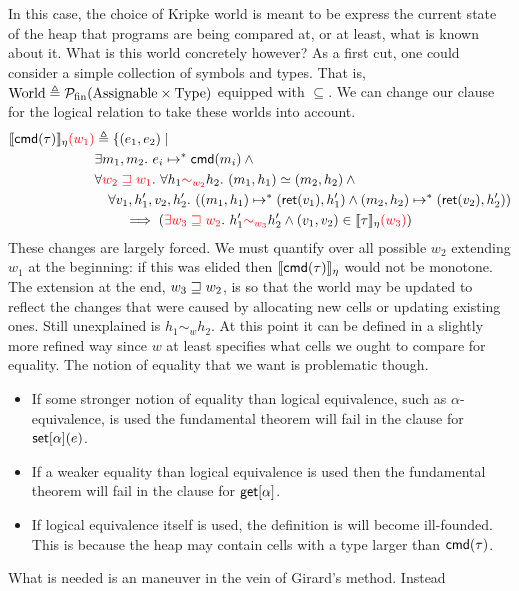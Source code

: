In this case, the choice of Kripke world is meant to be express the
current state of the heap that programs are being compared at, or at
least, what is known about it. What is this world concretely however?
As a first cut, one could consider a simple collection of symbols and
types. That is,
$\mathrm{World} \triangleq \mathcal{P_{\mathrm{fin}}}(\mathrm{Assignable} \times \mathrm{Type})$ equipped with
$\subseteq$. We can change our clause for the logical relation to take
these worlds into account.
\begin{align*}
  \llbracket \mathsf{cmd}(\tau) \rrbracket_\eta{\color{red} (w_1)}& \triangleq \{(e_1, e_2) \mid\\
  &\exists m_1, m_2.\ e_i \mapsto^* \mathsf{cmd}(m_i) \land{}\\
  &\forall {\color{red} w_2 \ensuremath{\mathrel{\sqsupseteq}}w_1}.\ \forall h_1 {\color{red} \sim_{w_2}} h_2.
  \ (m_1, h_1) \simeq (m_2, h_2) \land{}\\
  &\quad \forall v_1, h_1', v_2, h_2'.
  \ ((m_1, h_1) \mapsto^{*} (\mathsf{ret}(v_1), h_1') \land (m_2, h_2) \mapsto^{*} (\mathsf{ret}(v_2), h_2'))\\
  &\qquad \implies ({\color{red} \exists w_3 \mathrel{\sqsupseteq} w_2}.
    \ h_1' {\color{red} \sim_{w_3}} h_2' \land (v_1, v_2) \in \llbracket \tau \rrbracket_\eta{\color{red} (w_3)})
\end{align*}
These changes are largely forced. We must quantify over all possible
$w_2$ extending $w_1$ at the beginning: if this was elided then
$\llbracket \mathsf{cmd}(\tau) \rrbracket_\eta$ would not be monotone. The extension at the
end, $w_3 \mathrel{\sqsupseteq} w_2$, is so that the world may be updated to reflect
the changes that were caused by allocating new cells or updating
existing ones. Still unexplained is $h_1 \sim_w h_2$. At this point it
can be defined in a slightly more refined way since $w$ at least
specifies what cells we ought to compare for equality. The notion of
equality that we want is problematic though.
\begin{itemize}
\item If some stronger notion of equality than logical equivalence,
  such as $\alpha$-equivalence, is used the fundamental theorem will
  fail in the clause for $\mathsf{set}[\alpha](e)$.
\item If a weaker equality than logical equivalence is used then the
  fundamental theorem will fail in the clause for $\mathsf{get}[\alpha]$.
\item If logical equivalence itself is used, the definition is will
  become ill-founded. This is because the heap may contain cells with
  a type larger than $\mathsf{cmd}(\tau)$.
\end{itemize}
What is needed is an maneuver in the vein of Girard's method. Instead
